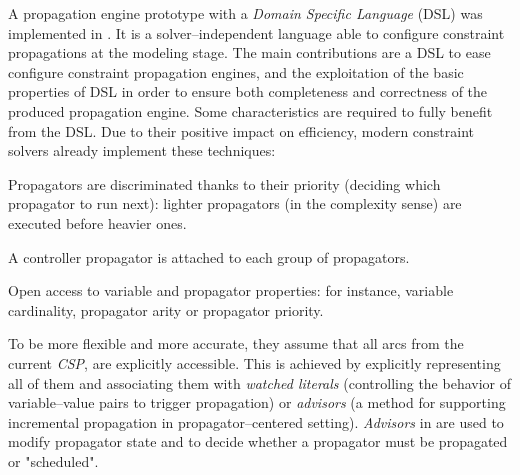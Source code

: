 A propagation engine prototype with a \textit{Domain Specific Language} (DSL) was implemented in \cite{Prudhomme2013}. It is a solver--independent language able to configure constraint propagations at the modeling stage. The main contributions are a DSL to ease configure constraint propagation engines, and the exploitation of the basic properties of DSL in order to ensure both completeness and correctness of the produced propagation engine. %
Some characteristics are required to fully benefit from the DSL. Due to their positive impact on efficiency, modern constraint solvers already implement these techniques:
\begin{inparaenum}[i)] %
	\item Propagators are discriminated thanks to their priority (deciding which propagator to run next): lighter propagators (in the complexity sense) are executed before heavier ones.
	\item A controller propagator is attached to each group of propagators.
	\item Open access to variable and propagator properties: for instance, variable cardinality, propagator arity or propagator priority.
\end{inparaenum}%
To be more flexible and more accurate, they assume that all arcs from the current \textit{CSP}, are explicitly accessible. This is achieved by explicitly representing all of them and associating them with {\it watched literals} \cite{Gent2006} (controlling the behavior of variable--value pairs to trigger propagation) or {\it advisors} \cite{Lagerkvist2007} (a method for supporting incremental propagation in propagator--centered setting). {\it Advisors} in \cite{Lagerkvist2007} are used to modify propagator state and to decide whether a propagator must be propagated or "scheduled". 


